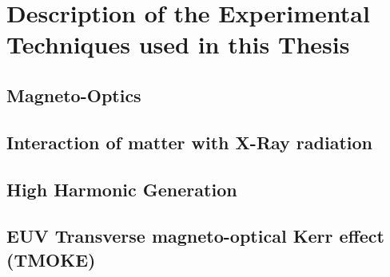 \chapter{Description of the Experimental Techniques used in this Thesis}

\section{Magneto-Optics}

\section{Interaction of matter with X-Ray radiation}

\section{High Harmonic Generation}

\section{EUV Transverse magneto-optical Kerr effect (TMOKE)}